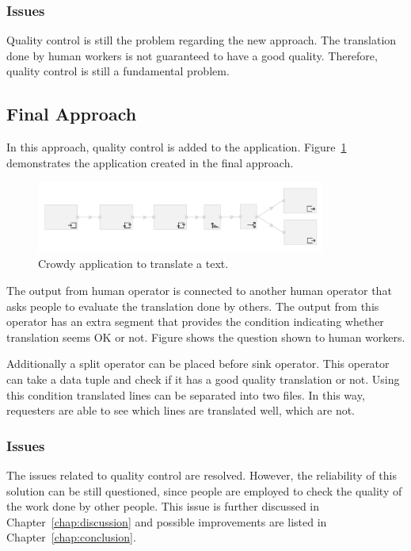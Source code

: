 \subsubsection{Issues}
Quality control is still the problem regarding the new approach. The translation done by human workers is not guaranteed to have a good quality. Therefore, quality control is still a fundamental problem.

\subsection{Final Approach}
In this approach, quality control is added to the application. Figure~\ref{fig:scenario2.2} demonstrates the application created in the final approach.

\begin{figure}[ht]
	\centering
	\includegraphics[width=0.85\textwidth]{figures/scenarios/scenario2_2.png}
	\caption{Crowdy application to translate a text.}
	\label{fig:scenario2.2}
\end{figure}

The output from human operator is connected to another human operator that asks people to evaluate the translation done by others. The output from this operator has an extra segment that provides the condition indicating whether translation seems OK or not. Figure shows the question shown to human workers.

Additionally a split operator can be placed before sink operator. This operator can take a data tuple and check if it has a good quality translation or not. Using this condition translated lines can be separated into two files. In this way, requesters are able to see which lines are translated well, which are not.

\subsubsection{Issues}
The issues related to quality control are resolved. However, the reliability of this solution can be still questioned, since people are employed to check the quality of the work done by other people. This issue is further discussed in Chapter~\ref{chap:discussion} and possible improvements are listed in Chapter~\ref{chap:conclusion}.